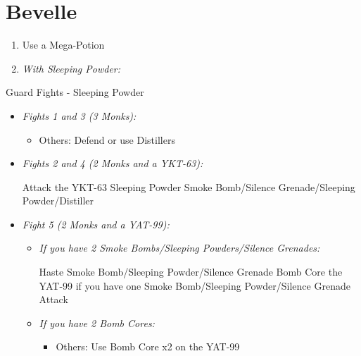 \chapter{Bevelle}
\begin{enumerate}
	\item Use a Mega-Potion
	\item \textit{With Sleeping Powder:}
\end{enumerate}
\begin{battle}{Guard Fights - Sleeping Powder}
	\begin{itemize}
		\item \textit{Fights 1 and 3 (3 Monks):}
			\begin{itemize}
				\tidusf Attack
				\item Others: Defend or use Distillers
			\end{itemize}
		\item \textit{Fights 2 and 4 (2 Monks and a YKT-63):}
			\begin{itemize}
				\tidusf Attack the YKT-63
				\rikkuf Sleeping Powder
				\kimahrif Smoke Bomb/Silence Grenade/Sleeping Powder/Distiller
			\end{itemize}
		\item \textit{Fight 5 (2 Monks and a YAT-99):}
			\begin{itemize}
				\item \textit{If you have 2 Smoke Bombs/Sleeping Powders/Silence Grenades:}
					\begin{itemize}
						\tidusf Haste \rikku
						\rikkuf Smoke Bomb/Sleeping Powder/Silence Grenade
						\rikkuf Bomb Core the YAT-99 if you have one
						\rikkuf Smoke Bomb/Sleeping Powder/Silence Grenade
						\tidusf Attack
					\end{itemize}
				\item \textit{If you have 2 Bomb Cores:}
					\begin{itemize}
						\tidusf Attack the Monks
						\item Others: Use Bomb Core x2 on the YAT-99
					\end{itemize}
			\end{itemize}
	\end{itemize}
\end{battle}
